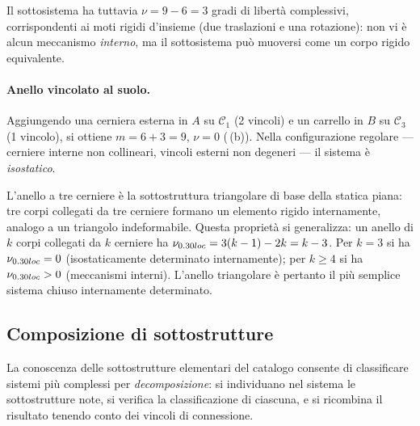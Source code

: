 Il sottosistema ha tuttavia $\nu = 9 - 6 = 3$ gradi di
libertà complessivi, corrispondenti ai moti rigidi d'insieme
(due traslazioni e una rotazione): non vi è alcun meccanismo
\emph{interno}, ma il sottosistema può muoversi come un
corpo rigido equivalente.

\paragraph{Anello vincolato al suolo.}
Aggiungendo una cerniera esterna in $A$ su $\mathcal{C}_1$
(2 vincoli) e un carrello in $B$ su $\mathcal{C}_3$ (1
vincolo), si ottiene $m = 6 + 3 = 9$, $\nu = 0$
(\,(b)).
Nella configurazione regolare --- cerniere interne non
collineari, vincoli esterni non degeneri --- il sistema
è \textit{isostatico}.









\begin{oss}
	L'anello a tre cerniere è la sottostruttura triangolare
	di base della statica piana: tre corpi collegati da tre
	cerniere formano un elemento rigido internamente, analogo
	a un triangolo indeformabile. Questa proprietà si
	generalizza: un anello di $k$ corpi collegati da $k$
	cerniere ha $\nu_{\rm loc} = 3(k-1) - 2k = k - 3$.
	Per $k = 3$ si ha $\nu_{\rm loc} = 0$ (isostaticamente
	determinato internamente); per $k \geq 4$ si ha
	$\nu_{\rm loc} > 0$ (meccanismi interni). L'anello
	triangolare è pertanto il più semplice sistema chiuso
	internamente determinato.
\end{oss}


\subsection{Composizione di sottostrutture}
\label{sec:composizione}

La conoscenza delle sottostrutture elementari del catalogo
consente di classificare sistemi più complessi per
\emph{decomposizione}: si individuano nel sistema le
sottostrutture note, si verifica la classificazione di
ciascuna, e si ricombina il risultato tenendo conto dei
vincoli di connessione.

